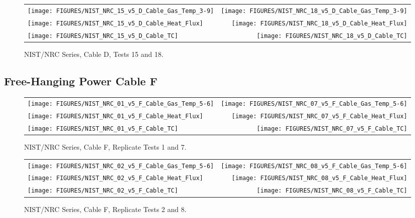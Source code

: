\begin{figure}[h]
\begin{tabular*}{\textwidth}{l@{\extracolsep{\fill}}r}
\texttt{[image: FIGURES/NIST\_NRC\_15\_v5\_D\_Cable\_Gas\_Temp\_3-9]} &
\texttt{[image: FIGURES/NIST\_NRC\_18\_v5\_D\_Cable\_Gas\_Temp\_3-9]} \\
\texttt{[image: FIGURES/NIST\_NRC\_15\_v5\_D\_Cable\_Heat\_Flux]} &
\texttt{[image: FIGURES/NIST\_NRC\_18\_v5\_D\_Cable\_Heat\_Flux]} \\
\texttt{[image: FIGURES/NIST\_NRC\_15\_v5\_D\_Cable\_TC]} &
\texttt{[image: FIGURES/NIST\_NRC\_18\_v5\_D\_Cable\_TC]}
\end{tabular*}
\caption{NIST/NRC Series, Cable D, Tests 15 and 18.}
\label{NIST_NRC_D_15_and_18}
\end{figure}


\clearpage



\subsection{Free-Hanging Power Cable F}

\vspace{1in}

\begin{figure}[h!]
\begin{tabular*}{\textwidth}{l@{\extracolsep{\fill}}r}
\texttt{[image: FIGURES/NIST\_NRC\_01\_v5\_F\_Cable\_Gas\_Temp\_5-6]} &
\texttt{[image: FIGURES/NIST\_NRC\_07\_v5\_F\_Cable\_Gas\_Temp\_5-6]} \\
\texttt{[image: FIGURES/NIST\_NRC\_01\_v5\_F\_Cable\_Heat\_Flux]} &
\texttt{[image: FIGURES/NIST\_NRC\_07\_v5\_F\_Cable\_Heat\_Flux]} \\
\texttt{[image: FIGURES/NIST\_NRC\_01\_v5\_F\_Cable\_TC]} &
\texttt{[image: FIGURES/NIST\_NRC\_07\_v5\_F\_Cable\_TC]}
\end{tabular*}
\caption{NIST/NRC Series, Cable F, Replicate Tests 1 and 7.}
\label{NIST_NRC_F_1_and_7}
\end{figure}

\begin{figure}[h]
\begin{tabular*}{\textwidth}{l@{\extracolsep{\fill}}r}
\texttt{[image: FIGURES/NIST\_NRC\_02\_v5\_F\_Cable\_Gas\_Temp\_5-6]} &
\texttt{[image: FIGURES/NIST\_NRC\_08\_v5\_F\_Cable\_Gas\_Temp\_5-6]} \\
\texttt{[image: FIGURES/NIST\_NRC\_02\_v5\_F\_Cable\_Heat\_Flux]} &
\texttt{[image: FIGURES/NIST\_NRC\_08\_v5\_F\_Cable\_Heat\_Flux]} \\
\texttt{[image: FIGURES/NIST\_NRC\_02\_v5\_F\_Cable\_TC]} &
\texttt{[image: FIGURES/NIST\_NRC\_08\_v5\_F\_Cable\_TC]}
\end{tabular*}
\caption{NIST/NRC Series, Cable F, Replicate Tests 2 and 8.}
\label{NIST_NRC_F_2_and_8}
\end{figure}

